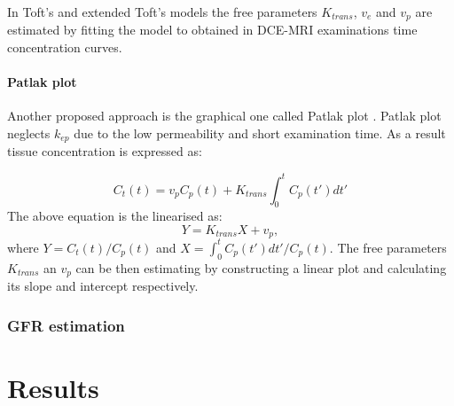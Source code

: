 In Toft's and extended Toft's models the free parameters $K_{trans}$, $v_e$ and $v_p$ are estimated by fitting the model to obtained in DCE-MRI examinations time concentration curves.  

\paragraph{Patlak plot}
Another proposed approach is the graphical one called Patlak plot \cite{patlak1983graphical}. Patlak plot neglects $k_{ep}$ due to the low permeability and short examination time. As a result tissue concentration is expressed as:

\begin{equation}
	\label{eq:patlak}
	C_{t}(t) =v_pC_p(t) + K_{trans}\int_{0}^{t}C_p(t')dt'  
\end{equation}
The above equation is the linearised as:
\begin{equation}
	\label{eq:patlak_lin}
	Y = K_{trans}X +v_p,  
\end{equation}
where $Y=C_t(t)/C_p(t)$ and $X=\int_{0}^{t}C_p(t')dt'/C_p(t)$. The free parameters $K_{trans}$ an $v_p$ can be then estimating by constructing a linear plot and calculating its slope and intercept respectively.


\subsubsection{GFR estimation}

\section{Results}

